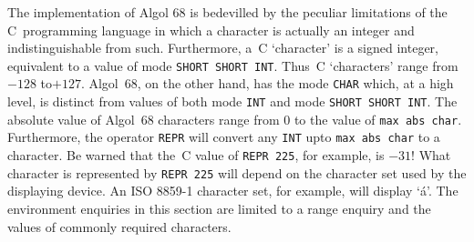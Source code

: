 The  implementation of Algol 68 is
bedevilled by the peculiar limitations of the C~programming language
in which a character is actually an integer and indistinguishable
from such. Furthermore, a~C `character' is a signed integer,
equivalent to a value of mode \verb|SHORT SHORT INT|. Thus~C
`characters' range from $-128$ to$+127$.  Algol~68, on the other
hand, has the mode \verb|CHAR| which, at a high level, is distinct
from values of both mode \verb|INT| and mode \verb|SHORT SHORT INT|.
The absolute value of Algol~68 characters range from $0$ to the value
of \verb|max abs char|. Furthermore, the operator \verb|REPR| will
convert any \verb|INT| upto \verb|max abs char| to a character. Be
warned that the~C value of \verb|REPR 225|, for example, is $-31$!
What character is represented by \verb|REPR 225| will depend on the
character set used by the displaying device. An ISO 8859-1 character
set, for example, will display `\'a'. The environment enquiries in
this section are limited to a range enquiry and the values of
commonly required characters.
